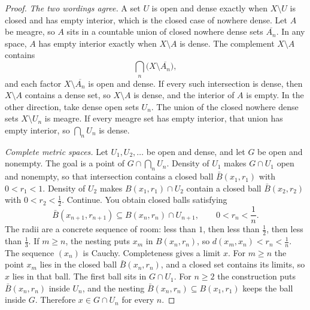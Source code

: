 \begin{proof}
\emph{The two wordings agree.} A set $U$ is open and dense exactly when $X\setminus U$ is closed and has empty interior, which is the closed case of nowhere dense. Let $A$ be meagre, so $A$ sits in a countable union of closed nowhere dense sets $\overline{A_n}$. In any space, $A$ has empty interior exactly when $X\setminus A$ is dense. The complement $X\setminus A$ contains
\[
\bigcap_n\bigl(X\setminus\overline{A_n}\bigr),
\]
and each factor $X\setminus\overline{A_n}$ is open and dense. If every such intersection is dense, then $X\setminus A$ contains a dense set, so $X\setminus A$ is dense, and the interior of $A$ is empty. In the other direction, take dense open sets $U_n$. The union of the closed nowhere dense sets $X\setminus U_n$ is meagre. If every meagre set has empty interior, that union has empty interior, so $\bigcap_n U_n$ is dense.

\emph{Complete metric spaces.} Let $U_1,U_2,\dots$ be open and dense, and let $G$ be open and nonempty. The goal is a point of $G\cap\bigcap_n U_n$. Density of $U_1$ makes $G\cap U_1$ open and nonempty, so that intersection contains a closed ball $\bar B(x_1,r_1)$ with $0<r_1<1$. Density of $U_2$ makes $B(x_1,r_1)\cap U_2$ contain a closed ball $\bar B(x_2,r_2)$ with $0<r_2<\frac12$. Continue. You obtain closed balls satisfying
\[
\bar B(x_{n+1},r_{n+1})\subseteq B(x_n,r_n)\cap U_{n+1},\qquad 0<r_n<\frac1n.
\]
The radii are a concrete sequence of room: less than $1$, then less than $\frac12$, then less than $\frac13$. If $m\ge n$, the nesting puts $x_m$ in $B(x_n,r_n)$, so $d(x_m,x_n)<r_n<\frac1n$. The sequence $(x_n)$ is Cauchy. Completeness gives a limit $x$. For $m\ge n$ the point $x_m$ lies in the closed ball $\bar B(x_n,r_n)$, and a closed set contains its limits, so $x$ lies in that ball. The first ball sits in $G\cap U_1$. For $n\ge2$ the construction puts $\bar B(x_n,r_n)$ inside $U_n$, and the nesting $\bar B(x_n,r_n)\subseteq B(x_1,r_1)$ keeps the ball inside $G$. Therefore $x\in G\cap U_n$ for every $n$.


\end{proof}
